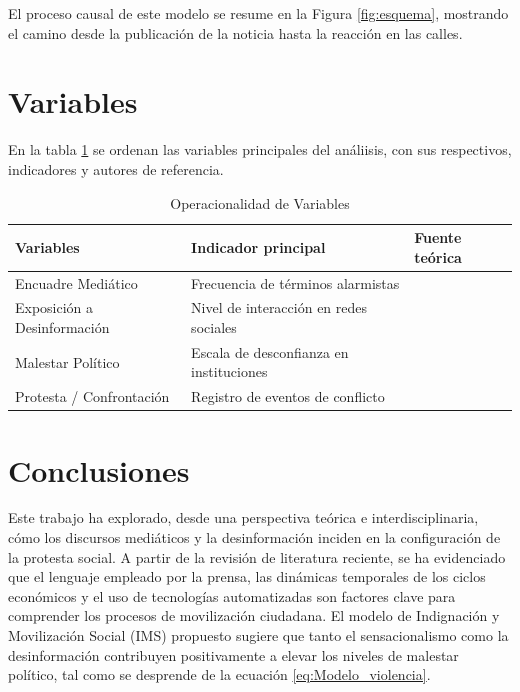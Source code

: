 \documentclass[12pt, a4paper]{article}
\begin{document}
El proceso causal de este modelo se resume en la Figura \ref{fig:esquema}, mostrando el camino desde la publicación de la noticia hasta la reacción en las calles.

\section{Variables}

En la tabla \ref{tab:variables} se ordenan las variables principales del análiisis, con sus respectivos, indicadores y autores de referencia.

\begin{table}[htbp]
    \centering
    \caption{Operacionalidad de Variables}
    \label{tab:variables}
    \begin{tabular}{lll}
    \toprule
    \textbf{Variables} &
    \textbf{Indicador principal} &
    \textbf{Fuente teórica} \\
    \midrule
Encuadre Mediático & Frecuencia de términos alarmistas & \cite{robiro_predictable_2026} \\
Exposición a Desinformación & Nivel de interacción en redes sociales & \cite{mamaev_automating_2026} \\
Malestar Político & Escala de desconfianza en instituciones & \cite{chen_press_2026} \\
Protesta / Confrontación & Registro de eventos de conflicto & \cite{wilfred_hong_2024} \\
\bottomrule
    \end{tabular}
    \end{table}

\section{Conclusiones}

Este trabajo ha explorado, desde una perspectiva teórica e interdisciplinaria, cómo los discursos mediáticos y la desinformación inciden en la configuración de la protesta social. A partir de la revisión de literatura reciente, se ha evidenciado que el lenguaje empleado por la prensa, las dinámicas temporales de los ciclos económicos y el uso de tecnologías automatizadas son factores clave para comprender los procesos de movilización ciudadana. El modelo de Indignación y Movilización Social (IMS) propuesto sugiere que tanto el sensacionalismo como la desinformación contribuyen positivamente a elevar los niveles de malestar político, tal como se desprende de la ecuación \ref{eq:Modelo_violencia}. 
\end{document}

